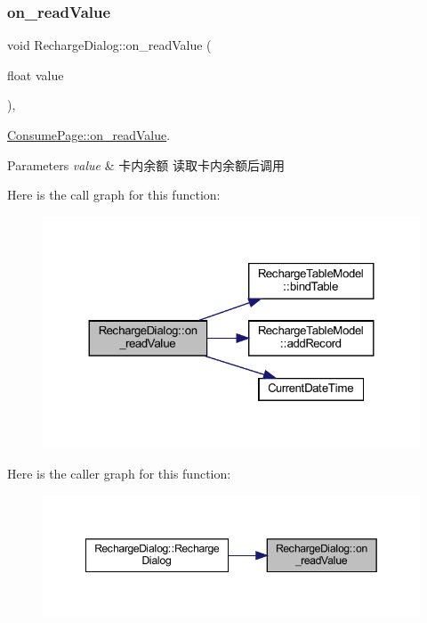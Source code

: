 \subsubsection{\texorpdfstring{on\_readValue}{on\_readValue}}
{\footnotesize\ttfamily void Recharge\+Dialog\+::on\+\_\+read\+Value (\begin{DoxyParamCaption}\item[{float}]{value }\end{DoxyParamCaption})\hspace{0.3cm}{\ttfamily [private]}, {\ttfamily [slot]}}



\mbox{\hyperlink{class_consume_page_aee88a9a496e88620383622b4ab20e4c9}{Consume\+Page\+::on\+\_\+read\+Value}}. 


\begin{DoxyParams}{Parameters}
{\em value} & 卡内余额 读取卡内余额后调用 \\
\hline
\end{DoxyParams}
Here is the call graph for this function\+:
\nopagebreak
\begin{figure}[H]
\begin{center}
\leavevmode
\includegraphics[width=324pt]{class_recharge_dialog_adfce62fdba02f8a9f105b646d86957aa_cgraph}
\end{center}
\end{figure}
Here is the caller graph for this function\+:
\nopagebreak
\begin{figure}[H]
\begin{center}
\leavevmode
\includegraphics[width=349pt]{class_recharge_dialog_adfce62fdba02f8a9f105b646d86957aa_icgraph}
\end{center}
\end{figure}
\mbox{\label{class_recharge_dialog_ae72f6af3e5f317cecafe239fe830853c}} 

